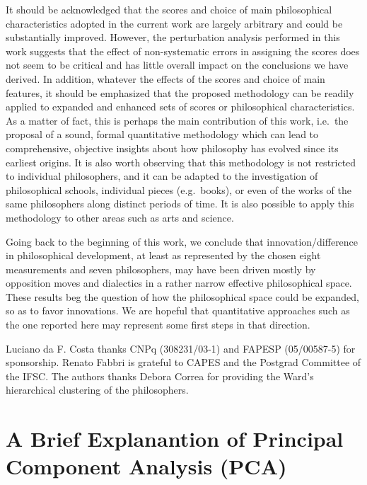\documentclass[%
 aip,
 jmp,%
 amsmath,amssymb,
 reprint,%
]{revtex4-1}
\begin{document}
It should be acknowledged that the scores and choice of main
philosophical characteristics adopted in the current work are largely
arbitrary and could be substantially improved.  However, the
perturbation analysis performed in this work suggests that the effect
of non-systematic errors in assigning the scores does not seem to be
critical and has little overall impact on the conclusions we have
derived.  In addition, whatever the effects of the scores and choice
of main features, it should be emphasized that the proposed
methodology can be readily applied to expanded and enhanced sets of
scores or philosophical characteristics.  As a matter of fact, this is
perhaps the main contribution of this work, i.e.\ the proposal of a
sound, formal quantitative methodology which can lead to
comprehensive, objective insights about how philosophy has evolved
since its earliest origins.  It is also worth observing that this
methodology is not restricted to individual philosophers, and it can
be adapted to the investigation of philosophical schools, individual
pieces (e.g.\ books), or even of the works of the same philosophers
along distinct periods of time.  It is also possible to apply this
methodology to other areas such as arts and science.

Going back to the beginning of this work, we conclude that
innovation/difference in philosophical development, at least as
represented by the chosen eight measurements and seven philosophers,
may have been driven mostly by opposition moves and dialectics in a
rather narrow effective philosophical space.  These results beg the
question of how the philosophical space could be expanded, so as to
favor innovations.  We are hopeful that quantitative approaches such
as the one reported here may represent some first steps in that
direction.

\begin{acknowledgments}
Luciano da F. Costa thanks CNPq (308231/03-1) and FAPESP (05/00587-5)
for sponsorship. Renato Fabbri is grateful to CAPES and 
the Postgrad Committee of the IFSC.  The authors thanks Debora
Correa for providing the Ward's hierarchical clustering of the
philosophers.
\end{acknowledgments}


\appendix

\section{A Brief Explanantion of Principal Component Analysis (PCA)}
\end{document}
